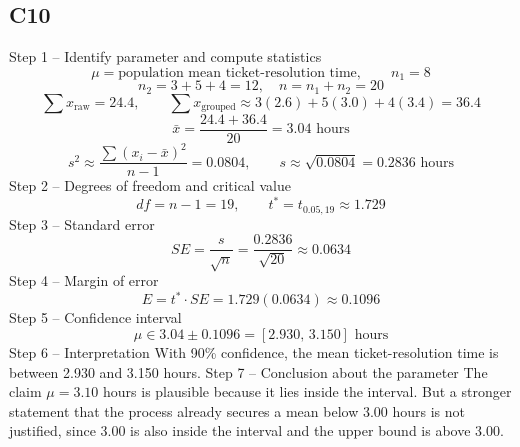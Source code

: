 \begin{ExamProblems}
		\subsection*{C10}
		Step 1 -- Identify parameter and compute statistics
		\[
		\mu=\text{population mean ticket-resolution time},\qquad n_1=8
		\]
		\[
		n_2=3+5+4=12,\quad n=n_1+n_2=20
		\]
		\[
		\sum x_{\text{raw}}=24.4,\qquad
		\sum x_{\text{grouped}}\approx 3(2.6)+5(3.0)+4(3.4)=36.4
		\]
		\[
		\bar{x}=\frac{24.4+36.4}{20}=3.04\text{ hours}
		\]
		\[
		s^2\approx\frac{\sum (x_i-\bar{x})^2}{n-1}=0.0804,\qquad s\approx\sqrt{0.0804}=0.2836\text{ hours}
		\]
		Step 2 -- Degrees of freedom and critical value
		\[
		df=n-1=19,\qquad t^*=t_{0.05,19}\approx 1.729
		\]
		Step 3 -- Standard error
		\[
		SE=\frac{s}{\sqrt{n}}=\frac{0.2836}{\sqrt{20}}\approx 0.0634
		\]
		Step 4 -- Margin of error
		\[
		E=t^*\cdot SE=1.729(0.0634)\approx 0.1096
		\]
		Step 5 -- Confidence interval
		\[
		\mu\in 3.04\pm 0.1096=[2.930,\,3.150]\text{ hours}
		\]
		Step 6 -- Interpretation
		With 90\% confidence, the mean ticket-resolution time is between 2.930 and 3.150 hours.
		Step 7 -- Conclusion about the parameter
		The claim $\mu=3.10$ hours is plausible because it lies inside the interval.
		But a stronger statement that the process already secures a mean below 3.00 hours is not justified, since 3.00 is also inside the interval and the upper bound is above 3.00.
	\end{ExamProblems}

